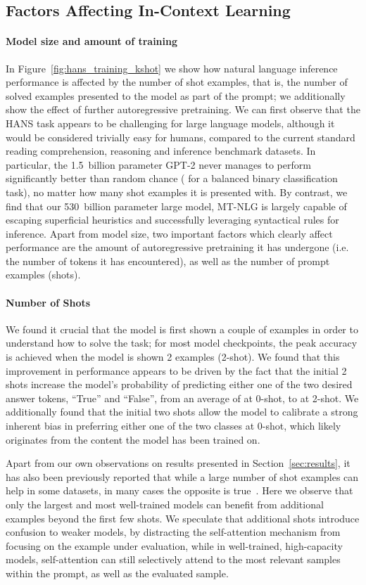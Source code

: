 \documentclass[11pt]{article}
\newcommand{\ours}{MT-NLG}
\begin{document}
\subsection{Factors Affecting In-Context Learning}
\paragraph{Model size and amount of training} In Figure~\ref{fig:hans_training_kshot} we show how natural language inference performance is affected by the number of shot examples, that is, the number of solved examples presented to the model as part of the prompt; we additionally show the effect of further autoregressive pretraining. We can first observe that the HANS task appears to be challenging for large language models, although it would be considered trivially easy for humans, compared to the current standard reading comprehension, reasoning and inference benchmark datasets. In particular, the 1.5~billion parameter GPT-2 never manages to perform significantly better than random chance ( for a balanced binary classification task), no matter how many shot examples it is presented with. By contrast, we find that our 530~billion parameter large model, {\ours} is largely capable of escaping superficial heuristics and successfully leveraging syntactical rules for inference. Apart from model size, two important factors which clearly affect performance are the amount of autoregressive pretraining it has undergone (i.e. the number of tokens it has encountered), as well as the number of prompt examples (shots).

\paragraph{Number of Shots}  We found it crucial that the model is first shown a couple of examples in order to understand how to solve the task; for most model checkpoints, the peak accuracy is achieved when the model is shown 2 examples (2-shot). We found that this improvement in performance appears to be driven by the fact that the initial 2 shots increase the model's probability of predicting either one of the two desired answer tokens, ``True'' and ``False'', from an average of  at 0-shot, to  at 2-shot. We additionally found that the initial two shots allow the model to calibrate a strong inherent bias in preferring either one of the two classes at 0-shot, which likely originates from the content the model has been trained on.

Apart from our own observations on results presented in Section~\ref{sec:results}, it has also been previously reported that while a large number of shot examples can help in some datasets, in many cases the opposite is true~\cite{brown2020language}. Here we observe that only the largest and most well-trained models can benefit from additional examples beyond the first few shots. We speculate that additional shots introduce confusion to weaker models, by distracting the self-attention mechanism from focusing on the example under evaluation, while in well-trained, high-capacity models, self-attention can still selectively attend to the most relevant samples within the prompt, as well as the evaluated sample.
\end{document}
